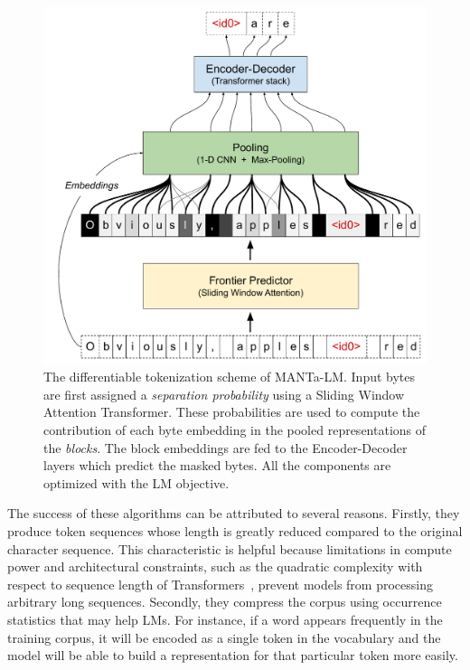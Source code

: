 \begin{figure}
\centering
\includegraphics[width=\linewidth]{sources/part_2/manta/images/full_difftok_schema.pdf}
\caption{The differentiable tokenization scheme of MANTa-LM. Input bytes are first assigned a \textit{separation probability} using a Sliding Window Attention Transformer. These probabilities are used to compute the contribution of each byte embedding in the pooled representations of the \textit{blocks}. The block embeddings are fed to the Encoder-Decoder layers which predict the masked bytes. All the components are optimized with the LM objective.}
\label{fig:overview_diagram}
\end{figure}

The success of these algorithms can be attributed to several reasons. Firstly, they produce token sequences whose length is greatly reduced compared to the original character sequence. This characteristic is helpful because limitations in compute power and architectural constraints, such as the quadratic complexity with respect to sequence length of Transformers~\cite{vaswani2017attention}, prevent models from processing arbitrary long sequences. Secondly, they compress the corpus using occurrence statistics that may help LMs. For instance, if a word appears frequently in the training corpus, it will be encoded as a single token in the vocabulary and the model will be able to build a representation for that particular token more easily.

